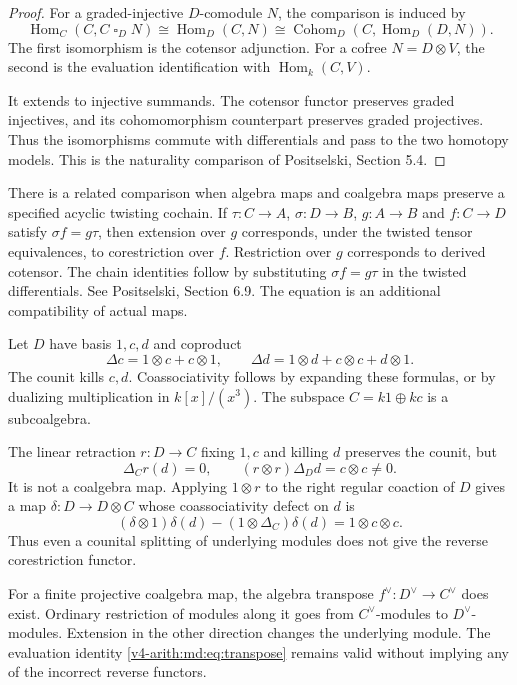 \begin{proof}
For a graded-injective $D$-comodule $N$, the comparison is
induced by
\[
 \operatorname{Hom}_C(C,C\mathbin{\square}_DN)
 \cong\operatorname{Hom}_D(C,N)
 \cong\operatorname{Cohom}_D(C,\operatorname{Hom}_D(D,N)).
\]
The first isomorphism is the cotensor adjunction. For a cofree
$N=D\otimes V$, the second is the evaluation identification
with $\operatorname{Hom}_k(C,V)$.

It extends to injective
summands. The cotensor functor preserves graded injectives,
and its cohomomorphism counterpart preserves graded
projectives. Thus the isomorphisms commute with differentials
and pass to the two homotopy models. This is the naturality
comparison of Positselski, Section 5.4.
\end{proof}

There is a related comparison when algebra maps and coalgebra
maps preserve a specified acyclic twisting cochain. If
$\tau:C\to A$, $\sigma:D\to B$, $g:A\to B$ and $f:C\to D$
satisfy $\sigma f=g\tau$, then extension over $g$ corresponds,
under the twisted tensor equivalences, to corestriction over
$f$. Restriction over $g$ corresponds to derived cotensor.
The chain identities follow by substituting $\sigma f=g\tau$
in the twisted differentials. See Positselski, Section 6.9.
The equation is an additional compatibility of actual maps.

\begin{example}
\label{v4-arith:md:ex:retraction}
Let $D$ have basis $1,c,d$ and coproduct
\[
 \Delta c=1\otimes c+c\otimes1,
 \qquad\Delta d=1\otimes d+c\otimes c+d\otimes1.
\]
The counit kills $c,d$. Coassociativity follows by expanding
these formulas, or by dualizing multiplication in $k[x]/(x^3)$.
The subspace $C=k1\oplus kc$ is a subcoalgebra.

The linear retraction $r:D\to C$ fixing $1,c$ and killing $d$
preserves the counit, but
\[
 \Delta_Cr(d)=0,\qquad(r\otimes r)\Delta_Dd=c\otimes c\ne0.
\]
It is not a coalgebra map. Applying $1\otimes r$ to the right
regular coaction of $D$ gives a map $\delta:D\to D\otimes C$
whose coassociativity defect on $d$ is
\[
 (\delta\otimes1)\delta(d)-(1\otimes\Delta_C)\delta(d)
 =1\otimes c\otimes c.
\]
Thus even a counital splitting of underlying modules does not
give the reverse corestriction functor.
\end{example}

For a finite projective coalgebra map, the algebra transpose
$f^\vee:D^\vee\to C^\vee$ does exist. Ordinary restriction
of modules along it goes from $C^\vee$-modules to
$D^\vee$-modules. Extension in the other direction changes
the underlying module. The evaluation identity
\eqref{v4-arith:md:eq:transpose} remains valid without implying
any of the incorrect reverse functors.

